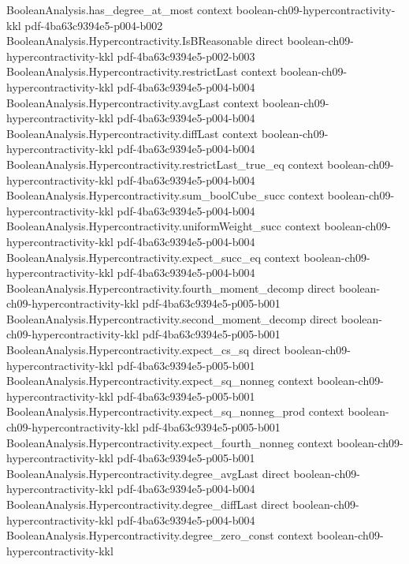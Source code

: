 \begin{lemma}
\proofstep
  {BooleanAnalysis.has_degree_at_most}
  {context}
  {boolean-ch09-hypercontractivity-kkl}
  {pdf-4ba63c9394e5-p004-b002}
\proofstep
  {BooleanAnalysis.Hypercontractivity.IsBReasonable}
  {direct}
  {boolean-ch09-hypercontractivity-kkl}
  {pdf-4ba63c9394e5-p002-b003}
\proofstep
  {BooleanAnalysis.Hypercontractivity.restrictLast}
  {context}
  {boolean-ch09-hypercontractivity-kkl}
  {pdf-4ba63c9394e5-p004-b004}
\proofstep
  {BooleanAnalysis.Hypercontractivity.avgLast}
  {context}
  {boolean-ch09-hypercontractivity-kkl}
  {pdf-4ba63c9394e5-p004-b004}
\proofstep
  {BooleanAnalysis.Hypercontractivity.diffLast}
  {context}
  {boolean-ch09-hypercontractivity-kkl}
  {pdf-4ba63c9394e5-p004-b004}
\proofstep
  {BooleanAnalysis.Hypercontractivity.restrictLast_true_eq}
  {context}
  {boolean-ch09-hypercontractivity-kkl}
  {pdf-4ba63c9394e5-p004-b004}
\proofstep
  {BooleanAnalysis.Hypercontractivity.sum_boolCube_succ}
  {context}
  {boolean-ch09-hypercontractivity-kkl}
  {pdf-4ba63c9394e5-p004-b004}
\proofstep
  {BooleanAnalysis.Hypercontractivity.uniformWeight_succ}
  {context}
  {boolean-ch09-hypercontractivity-kkl}
  {pdf-4ba63c9394e5-p004-b004}
\proofstep
  {BooleanAnalysis.Hypercontractivity.expect_succ_eq}
  {context}
  {boolean-ch09-hypercontractivity-kkl}
  {pdf-4ba63c9394e5-p004-b004}
\proofstep
  {BooleanAnalysis.Hypercontractivity.fourth_moment_decomp}
  {direct}
  {boolean-ch09-hypercontractivity-kkl}
  {pdf-4ba63c9394e5-p005-b001}
\proofstep
  {BooleanAnalysis.Hypercontractivity.second_moment_decomp}
  {direct}
  {boolean-ch09-hypercontractivity-kkl}
  {pdf-4ba63c9394e5-p005-b001}
\proofstep
  {BooleanAnalysis.Hypercontractivity.expect_cs_sq}
  {direct}
  {boolean-ch09-hypercontractivity-kkl}
  {pdf-4ba63c9394e5-p005-b001}
\proofstep
  {BooleanAnalysis.Hypercontractivity.expect_sq_nonneg}
  {context}
  {boolean-ch09-hypercontractivity-kkl}
  {pdf-4ba63c9394e5-p005-b001}
\proofstep
  {BooleanAnalysis.Hypercontractivity.expect_sq_nonneg_prod}
  {context}
  {boolean-ch09-hypercontractivity-kkl}
  {pdf-4ba63c9394e5-p005-b001}
\proofstep
  {BooleanAnalysis.Hypercontractivity.expect_fourth_nonneg}
  {context}
  {boolean-ch09-hypercontractivity-kkl}
  {pdf-4ba63c9394e5-p005-b001}
\proofstep
  {BooleanAnalysis.Hypercontractivity.degree_avgLast}
  {direct}
  {boolean-ch09-hypercontractivity-kkl}
  {pdf-4ba63c9394e5-p004-b004}
\proofstep
  {BooleanAnalysis.Hypercontractivity.degree_diffLast}
  {direct}
  {boolean-ch09-hypercontractivity-kkl}
  {pdf-4ba63c9394e5-p004-b004}
\proofstep
  {BooleanAnalysis.Hypercontractivity.degree_zero_const}
  {context}
  {boolean-ch09-hypercontractivity-kkl}

\end{lemma}
